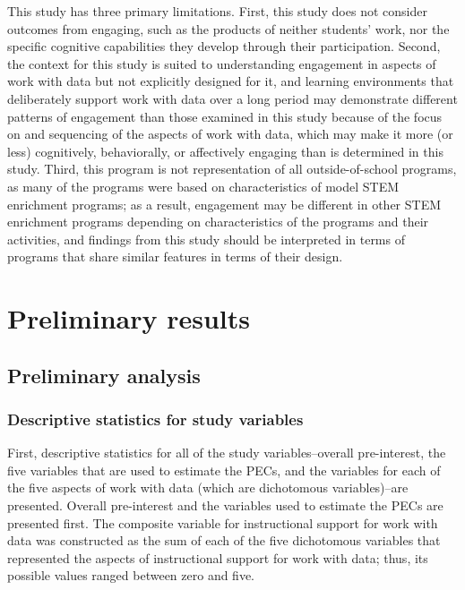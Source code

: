 \documentclass[]{msu-thesis}
\theoremstyle{definition}
\theoremstyle{definition}
\theoremstyle{definition}
\theoremstyle{remark}
\begin{document}
This study has three primary limitations. First, this study does not
consider outcomes from engaging, such as the products of neither
students' work, nor the specific cognitive capabilities they develop
through their participation. Second, the context for this study is
suited to understanding engagement in aspects of work with data but not
explicitly designed for it, and learning environments that deliberately
support work with data over a long period may demonstrate different
patterns of engagement than those examined in this study because of the
focus on and sequencing of the aspects of work with data, which may make
it more (or less) cognitively, behaviorally, or affectively engaging
than is determined in this study. Third, this program is not
representation of all outside-of-school programs, as many of the
programs were based on characteristics of model STEM enrichment
programs; as a result, engagement may be different in other STEM
enrichment programs depending on characteristics of the programs and
their activities, and findings from this study should be interpreted in
terms of programs that share similar features in terms of their design.

\chapter{Preliminary results}\label{preliminary-results}

\section{Preliminary analysis}\label{preliminary-analysis}

\subsection{Descriptive statistics for study
variables}\label{descriptive-statistics-for-study-variables}

First, descriptive statistics for all of the study variables--overall
pre-interest, the five variables that are used to estimate the PECs, and
the variables for each of the five aspects of work with data (which are
dichotomous variables)--are presented. Overall pre-interest and the
variables used to estimate the PECs are presented first. The composite
variable for instructional support for work with data was constructed as
the sum of each of the five dichotomous variables that represented the
aspects of instructional support for work with data; thus, its possible
values ranged between zero and five.
\end{document}
